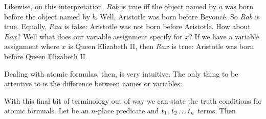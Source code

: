 
Likewise, on this interpretation, $Rab$ is true iff the object named by $a$ was born before the object named by $b$. Well, Aristotle was born before Beyonc\'e. So $Rab$ is true. Equally, $Raa$ is false: Aristotle was not born before Aristotle. How about $Rax$? Well what does our variable assignment specify for $x$? If we have a variable assignment where $x$ is Queen Elizabeth II, then $Rax$ is true: Aristotle was born before Queen Elizabeth II.

Dealing with atomic formulas, then, is very intuitive. The only thing to be attentive to is the difference between names or variables:

With this final bit of terminology out of way we can state the truth conditions for atomic formuals. Let  be an $n$-place predicate and $t_1,\,t_2\ldots t_{n}$ terms. Then


